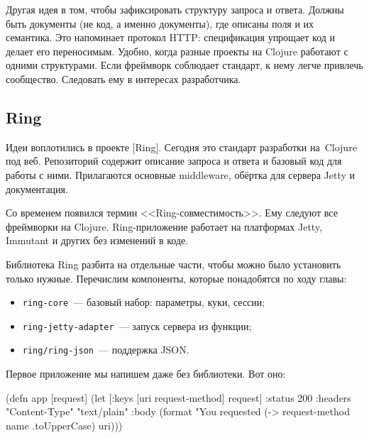 Другая идея в том, чтобы зафиксировать структуру запроса и ответа. Должны быть
документы (не код, а именно документы), где описаны поля и их семантика. Это
напоминает протокол HTTP: спецификация упрощает код и делает его
переносимым. Удобно, когда разные проекты на Clojure работают с одними
структурами. Если фреймворк соблюдает стандарт, к нему легче привлечь
сообщество. Следовать ему в интересах разработчика.

\subsection{Ring}

\label{ring-jetty}

Идеи воплотились в проекте [Ring].
Сегодня это стандарт разработки на~Clojure под веб. Репозиторий содержит описание
запроса и ответа и базовый код для работы с ними. Прилагаются основные middleware,
обёртка для сервера Jetty и документация.


\mnoindent
Со временем появился термин <<Ring-совмести\-мость>>. Ему следуют все фреймворки
на Clojure. Ring-приложение работает на платформах Jetty, Immutant и других без
изменений в коде.

Библиотека Ring разбита на отдельные части, чтобы можно было установить только
нужные. Перечислим компоненты, которые понадобятся по ходу главы:

\begin{itemize}

\item
  \verb|ring-core|~--- базовый набор: параметры, куки, сессии;

\item
  \verb|ring-jetty-adapter|~--- запуск сервера из функции;

\item
  \verb|ring/ring-json|~--- поддержка JSON.

\end{itemize}

Первое приложение мы напишем даже без библиотеки. Вот оно:


\label{first-handler}


\ifx\DEVICETYPE\MOBILE

\begin{english}
  \begin{clojure}
(defn app [request]
 (let [{:keys [uri request-method]}
       request]
  {:status 200
   :headers {"Content-Type" "text/plain"}
   :body (format "You requested %
           (-> request-method
               name
               .toUpperCase)
           uri)}))
  \end{clojure}
\end{english}

